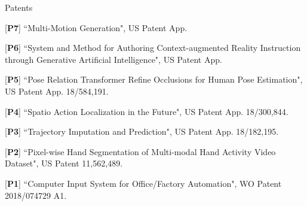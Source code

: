\begin{cventries}
\vspace{-.5em}
\cvpub
{Patents}{
\begin{cvitems}
    \item {[\textbf{P7}] ``Multi-Motion Generation", US Patent App.}
    \item {[\textbf{P6}] ``System and Method for Authoring Context-augmented Reality Instruction through Generative Artificial Intelligence", US Patent App.}
    \item {[\textbf{P5}] ``Pose Relation Transformer Refine Occlusions for Human Pose Estimation", US Patent App. 18/584,191.}
    \item {[\textbf{P4}] ``Spatio Action Localization in the Future", US Patent App. 18/300,844.}
    \item {[\textbf{P3}] ``Trajectory Imputation and Prediction", US Patent App. 18/182,195. }
    \item {[\textbf{P2}] ``Pixel-wise Hand Segmentation of Multi-modal Hand Activity Video Dataset", US Patent 11,562,489.}
    \item {[\textbf{P1}] ``Computer Input System for Office/Factory Automation", WO Patent 2018/074729 A1.}
\end{cvitems}
}


\end{cventries}
